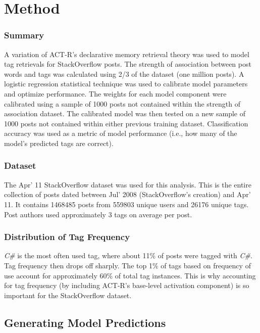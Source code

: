 \documentclass[10pt,letterpaper]{article}
\begin{document}
\section{Method}

\subsubsection{Summary}

A variation of ACT-R's declarative memory retrieval theory \cite{Anderson2004} was used to model tag retrievals for StackOverflow posts.
The strength of association between post words and tags was calculated using 2/3 of the dataset (one million posts).
A logistic regression statistical technique was used to calibrate model parameters and optimize performance.
The weights for each model component were calibrated using a sample of \num{1000} posts not contained within the strength of association dataset.
The calibrated model was then tested on a new sample of \num{1000} posts not contained within either previous training dataset.
Classification accuracy was used as a metric of model performance (i.e., how many of the model's predicted tags are correct).

\subsubsection{Dataset}

The Apr' 11 StackOverflow dataset \cite{DataDump2011} was used for this analysis.
This is the entire collection of posts dated between Jul' 2008 (StackOverflow's creation) and Apr' 11.
It contains \num{1468485} posts from \num{559803} unique users and \num{26176} unique tags.
Post authors used approximately 3 tags on average per post.

\subsubsection{Distribution of Tag Frequency}
\emph{C\#} is the most often used tag, where about 11\% of posts were tagged with \emph{C\#}.
Tag frequency then drops off sharply.
The top 1\% of tags based on frequency of use account for approximately 60\% of total tag instances.
This is why accounting for tag frequency (by including ACT-R's base-level activation component) is so important for the StackOverflow dataset.

\subsection{Generating Model Predictions}
\end{document}
